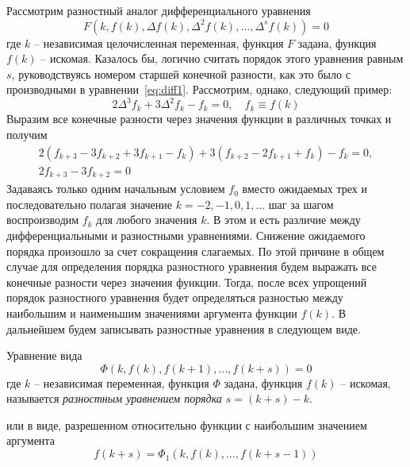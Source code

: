 \documentclass[../../calc-math-exam-2023.tex]{subfiles}
\begin{document}
    Рассмотрим разностный аналог дифференциального уравнения
    \begin{equation}
        F\left( k, f(k), \Delta f(k), \Delta^2 f(k), \dots, \Delta^s f(k) \right) = 0 \label{eq:diff2}
    \end{equation}
    где $k$ -- независимая целочисленная переменная, функция $F$ задана, функция $f(k)$ -- искомая.
    Казалось бы, логично считать порядок этого уравнения равным $s$, руководствуясь номером
    старшей конечной разности, как это было с производными в уравнении~\eqref{eq:diff1}.
    Рассмотрим, однако, следующий пример:
    \begin{equation*}
        2\Delta^3 f_k + 3 \Delta^2 f_k - f_k = 0, \quad f_k \equiv f(k)
    \end{equation*}
    Выразим все конечные разности через значения функции в различных точках и получим
    \begin{gather*}
        2(f_{k+3} - 3f_{k+2} + 3f_{k+1} - f_k) + 3(f_{k+2} - 2f_{k+1} + f_k) - f_k = 0, \\
        2f_{k+3} - 3f_{k+2} = 0
    \end{gather*}
    Задаваясь только одним начальным условием $f_0$ вместо ожидаемых трех и последовательно полагая
    значение $k = -2, -1, 0, 1, \dots$ шаг за шагом воспроизводим $f_k$ для любого значения $k$.
    В этом и есть различие между дифференциальными и разностными уравнениями. Снижение
    ожидаемого порядка произошло за счет сокращения слагаемых. По этой причине в общем случае
    для определения порядка разностного уравнения будем выражать все конечные разности через значения функции.
    Тогда, после всех упрощений порядок разностного уравнения будет определяться разностью между
    наибольшим и наименьшим значениями аргумента функции $f(k)$. В дальнейшем будем записывать разностные
    уравнения в следующем виде.
    \begin{definition}
        Уравнение вида
        \begin{equation*}
            \Phi \left( k, f(k), f(k+1), \dots, f(k+s) \right) = 0
        \end{equation*}
        где $k$ -- независимая переменная, функция $\Phi$ задана, функция $f(k)$ -- искомая,
        называется \emph{разностным уравнением порядка $s = (k + s) - k$}.
    \end{definition}
    или в виде, разрешенном относительно функции с наибольшим значением аргумента
    \begin{equation*}
        f(k+s) = \Phi_1 \left( k, f(k), \dots, f(k + s - 1) \right)
    \end{equation*}
\end{document}
